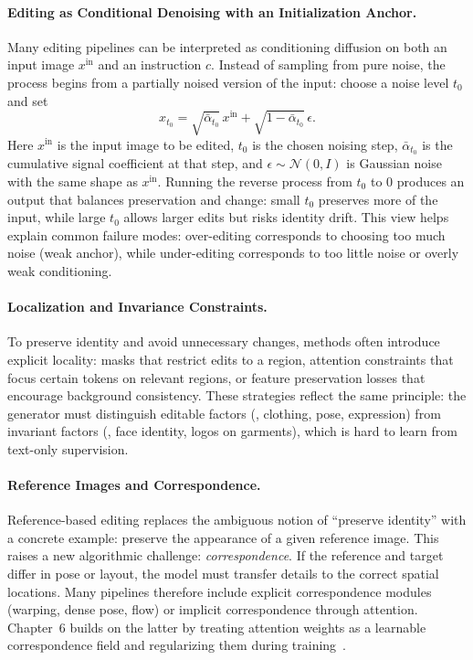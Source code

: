 \paragraph{Editing as Conditional Denoising with an Initialization Anchor.}
Many editing pipelines can be interpreted as conditioning diffusion on both an input image $x^{\mathrm{in}}$ and an instruction $c$. Instead of sampling from pure noise, the process begins from a partially noised version of the input: choose a noise level $t_0$ and set
\begin{equation}
x_{t_0}=\sqrt{\bar\alpha_{t_0}}\,x^{\mathrm{in}}+\sqrt{1-\bar\alpha_{t_0}}\,\epsilon.
\end{equation}
Here $x^{\mathrm{in}}$ is the input image to be edited, $t_0$ is the chosen noising step, $\bar\alpha_{t_0}$ is the cumulative signal coefficient at that step, and $\epsilon\sim\mathcal{N}(0,I)$ is Gaussian noise with the same shape as $x^{\mathrm{in}}$. Running the reverse process from $t_0$ to $0$ produces an output that balances preservation and change: small $t_0$ preserves more of the input, while large $t_0$ allows larger edits but risks identity drift. This view helps explain common failure modes: over-editing corresponds to choosing too much noise (weak anchor), while under-editing corresponds to too little noise or overly weak conditioning.

\paragraph{Localization and Invariance Constraints.}
To preserve identity and avoid unnecessary changes, methods often introduce explicit locality: masks that restrict edits to a region, attention constraints that focus certain tokens on relevant regions, or feature preservation losses that encourage background consistency. These strategies reflect the same principle: the generator must distinguish editable factors (\eg, clothing, pose, expression) from invariant factors (\eg, face identity, logos on garments), which is hard to learn from text-only supervision.

\paragraph{Reference Images and Correspondence.}
Reference-based editing replaces the ambiguous notion of ``preserve identity'' with a concrete example: preserve the appearance of a given reference image. This raises a new algorithmic challenge: \emph{correspondence}. If the reference and target differ in pose or layout, the model must transfer details to the correct spatial locations. Many pipelines therefore include explicit correspondence modules (warping, dense pose, flow) or implicit correspondence through attention. Chapter~6 builds on the latter by treating attention weights as a learnable correspondence field and regularizing them during training~\citep{zhou2025learning}.

